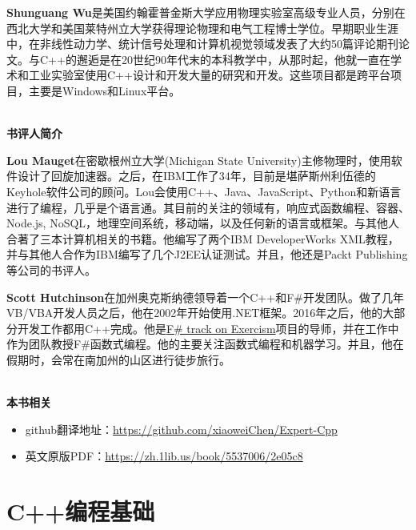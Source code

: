 \documentclass[11pt,a4paper,UTF8]{ctexart}
\begin{document}
	\textbf{Shunguang Wu}是美国约翰霍普金斯大学应用物理实验室高级专业人员，分别在西北大学和美国莱特州立大学获得理论物理和电气工程博士学位。早期职业生涯中，在非线性动力学、统计信号处理和计算机视觉领域发表了大约50篇评论期刊论文。与C++的邂逅是在20世纪90年代末的本科教学中，从那时起，他就一直在学术和工业实验室使用C++设计和开发大量的研究和开发。这些项目都是跨平台项目，主要是Windows和Linux平台。\par
	
	\hspace*{\fill} \\ %
	\noindent\textbf{书评人简介}\ \par
	\textbf{Lou Mauget}在密歇根州立大学(Michigan State University)主修物理时，使用软件设计了回旋加速器。之后，在IBM工作了34年，目前是堪萨斯州利伍德的Keyhole软件公司的顾问。Lou会使用C++、Java、JavaScript、Python和新语言进行了编程，几乎是个语言通。其目前的关注的领域有，响应式函数编程、容器、Node.js, NoSQL，地理空间系统，移动端，以及任何新的语言或框架。与其他人合著了三本计算机相关的书籍。他编写了两个IBM DeveloperWorks XML教程，并与其他人合作为IBM编写了几个J2EE认证测试。并且，他还是Packt Publishing等公司的书评人。 \par
	
	\textbf{Scott Hutchinson}在加州奥克斯纳德领导着一个C++和F\#开发团队。做了几年VB/VBA开发人员之后，他在2002年开始使用.NET框架。2016年之后，他的大部分开发工作都用C++完成。他是\href{https://github.com/exercism/fsharp}{F\# track on Exercism}项目的导师，并在工作中作为团队教授F\#函数式编程。他的主要关注函数式编程和机器学习。并且，他在假期时，会常在南加州的山区进行徒步旅行。 \par
	
	\hspace*{\fill} \\ %
	\noindent\textbf{本书相关}\ \par
	\begin{itemize}
		\item github翻译地址：\href{https://github.com/xiaoweiChen/Expert-Cpp}{https://github.com/xiaoweiChen/Expert-Cpp}
		\item 英文原版PDF：\href{https://zh.1lib.us/book/5537006/2e05c8}{https://zh.1lib.us/book/5537006/2e05c8}
	\end{itemize}
	\newpage
	
	\tableofcontents
	\newpage
	
	\section{C++编程基础}
		
\end{document}
